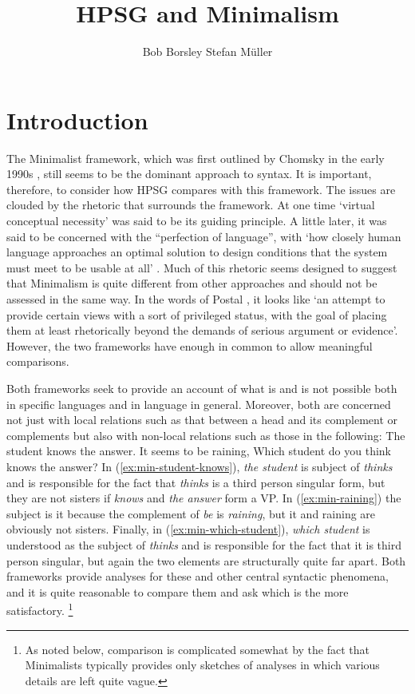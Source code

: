 \documentclass[output=paper]{langsci/langscibook}
\author{%
	Bob Borsley\affiliation{University of Essex}%
	\lastand Stefan Müller\affiliation{Humboldt-Universität zu Berlin}%
}
\title{HPSG and Minimalism}
\begin{document}
\section{Introduction}
\label{sec:min-intro}

The Minimalist framework, which was first outlined by Chomsky in the early 1990s \citep{Chomsky93b-u,Chomsky95a-u}, still seems to be the dominant approach to syntax. It is important, therefore, to consider how HPSG compares with this framework. The issues are clouded by the rhetoric that surrounds the framework. At one time `virtual conceptual necessity' was said to be its guiding principle. A little later, it was said to be concerned with the ``perfection of language'', with `how closely human language approaches an optimal solution to design conditions that the system must meet to be usable at all' \citet[58]{Chomsky2002a-u}. Much of this rhetoric seems designed to suggest that Minimalism is quite different from other approaches and should not be assessed in the same way. In the words of Postal \citet[19]{Postal2003a}, it looks like `an attempt to provide certain views with a sort of privileged status, with the goal of placing them at least rhetorically beyond the demands of serious argument or evidence'. However, the two frameworks have enough in common to allow meaningful comparisons.


Both frameworks seek to provide an account of what is and is not possible both in specific languages and in language in general. Moreover, both are concerned not just with local relations such as that between a head and its complement or complements but also with non-local relations such as those in the following:
\ea\label{ex:min-student-knows}
The student knows the answer.
\z
\ea\label{ex:min-raining}
It seems to be raining,
\z
\ea\label{ex:min-which-student}
Which student do you think knows the answer? 
\z
In (\ref{ex:min-student-knows}), \textit{the student} is subject of \textit{thinks} and is responsible for the fact that \textit{thinks} is a third person singular form, but they are not sisters if \textit{knows} and \textit{the answer} form a VP. In (\ref{ex:min-raining}) the subject is it because the complement of \textit{be} is \textit{raining}, but it and raining are obviously not sisters. Finally, in (\ref{ex:min-which-student}), \textit{which student} is understood as the subject of \textit{thinks} and is responsible for the fact that it is third person singular, but again the two elements are structurally quite far apart. Both frameworks provide analyses for these and other central syntactic phenomena, and it is quite reasonable to compare them and ask which is the more satisfactory.%
	\footnote{As noted below, comparison is complicated somewhat by the fact that Minimalists typically provides only sketches of analyses in which various details are left quite vague.}%
\end{document}
